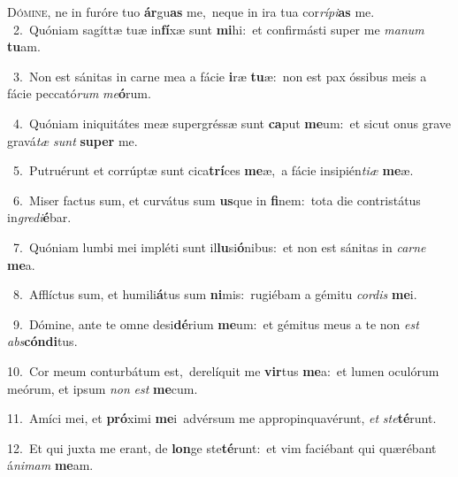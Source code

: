 \lettrine{\initial\textcolor{\initialcolor}{D}}{ómine,} ne in furóre tuo \textbf{ár}\-gu\textbf{as} me,~\star neque in ira tua cor\-\textit{rí}\-\textit{pi}\textbf{as} me.\\
{\numbfont\textcolor{\numbcolor}{~2.}}~Quóniam sagíttæ tuæ in\-\textbf{fí}\-xæ sunt \textbf{mi}\-hi:~\star et confirmásti super me \textit{ma}\-\textit{num} \textbf{tu}\-am.\par
{\numbfont\textcolor{\numbcolor}{~3.}}~Non est sánitas in carne mea a fácie \textbf{i}\-ræ \textbf{tu}\-æ:~\star non est pax óssibus meis a fácie peccató\textit{rum} \textit{me}\-\textbf{ó}rum.\par
{\numbfont\textcolor{\numbcolor}{~4.}}~Quóniam iniquitátes meæ supergréssæ sunt \textbf{ca}\-put \textbf{me}\-um:~\star et sicut onus grave gravá\textit{tæ} \textit{sunt} \textbf{su}\-\textbf{per} me.\par
{\numbfont\textcolor{\numbcolor}{~5.}}~Putruérunt et corrúptæ sunt cica\-\textbf{trí}\-ces \textbf{me}\-æ,~\star a fácie insipién\-\textit{ti}\-\textit{æ} \textbf{me}\-æ.\par
{\numbfont\textcolor{\numbcolor}{~6.}}~Miser factus sum, et curvátus sum \textbf{us}\-que in \textbf{fi}\-nem:~\star tota die contristátus in\-\textit{gre}\-\textit{di}\textbf{é}bar.\par
{\numbfont\textcolor{\numbcolor}{~7.}}~Quóniam lumbi mei impléti sunt il\-\textbf{lu}\-si\-\textbf{ó}\-nibus:~\star et non est sánitas in \textit{car}\-\textit{ne} \textbf{me}\-a.\par
{\numbfont\textcolor{\numbcolor}{~8.}}~Afflíctus sum, et humili\-\textbf{á}\-tus sum \textbf{ni}\-mis:~\star rugiébam a gémitu \textit{cor}\-\textit{dis} \textbf{me}\-i.\par
{\numbfont\textcolor{\numbcolor}{~9.}}~Dómine, ante te omne desi\-\textbf{dé}\-rium \textbf{me}\-um:~\star et gémitus meus a te non \textit{est} \textit{abs}\-\textbf{cón}\textbf{di}tus.\par
{\numbfont\textcolor{\numbcolor}{10.}}~Cor meum conturbátum est,~\dagger derelíquit me \textbf{vir}\-tus \textbf{me}\-a:~\star et lumen oculórum meórum, et ipsum \textit{non} \textit{est} \textbf{me}\-cum.\par
{\numbfont\textcolor{\numbcolor}{11.}}~Amíci mei, et \textbf{pró}\-ximi \textbf{me}\-i~\star advérsum me appropinquavérunt, \textit{et} \textit{ste}\-\textbf{té}runt.\par
{\numbfont\textcolor{\numbcolor}{12.}}~Et qui juxta me erant, de \textbf{lon}\-ge ste\-\textbf{té}\-runt:~\star et vim faciébant qui quærébant á\-\textit{ni}\-\textit{mam} \textbf{me}\-am.\par
